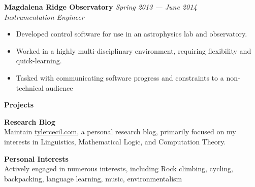 \documentclass[11pt,a4paper,sans]{article}
\newcommand{\cvcolor}[1]{{\color{MidnightBlue}#1}}
\renewcommand{\section}[1]{
  \cvcolor{\noindent \textbf{\LARGE #1}}
  \vspace{.5em}\\
}
\begin{document}
\textbf{Magdalena Ridge Observatory} \hfill \textsl{Spring 2013 --- June 2014}\\
\textsl{Instrumentation Engineer}
\vspace{.25em}
\begin{itemize}
  \item Developed control software for use in an astrophysics lab and
    observatory.
  \item Worked in a highly multi-disciplinary environment, requiring
    flexibility and quick-learning.
  \item Tasked with communicating software progress and constraints to a
    non-technical audience
\end{itemize}
\vspace{1em}

\section{Projects}
\vspace{-2.5em}
\begin{multicols}{2}

  \noindent
  \textbf{Research Blog}\\
  Maintain \href{https://tylercecil.com}{tylercecil.com}, a personal research
  blog, primarily focused on my interests in Linguistics, Mathematical Logic,
  and Computation Theory.

  \columnbreak

  \noindent
  \textbf{Personal Interests}\\
  Actively engaged in numerous interests, including
  Rock climbing, cycling, backpacking, language learning, music,
  environmentalism

\end{multicols}
\end{document}
